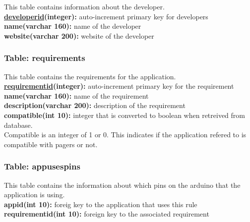 			This table contains information about the developer. \\
			{\bf \underline{developerid}(integer):} auto-increment primary key for developers \\
			\textbf{name(varchar 160):} name of the developer \\
			\textbf{website(varchar 200):} website of the developer \\

		\subsubsection{Table: requirements}

			This table contains the requirements for the application. \\
			{\bf \underline{requirementid}(integer):} auto-increment primary key for the requirement \\
			\textbf{name(varchar 160):} name of the requirement \\
			\textbf{description(varchar 200):} description of the requirement \\
			\textbf{compatible(int 10):} integer that is converted to boolean when retreived from database. \\

			Compatible is an integer of 1 or 0. This indicates if the application refered to is compatible with pagers or not.

		\subsubsection{Table: appusespins}

			This table contains the information about which pins on the arduino that the application is using. \\
			\textbf{appid(int 10):} foreig key to the application that uses this rule \\
			\textbf{requirementid(int 10):} foreign key to the associated requirement \\

